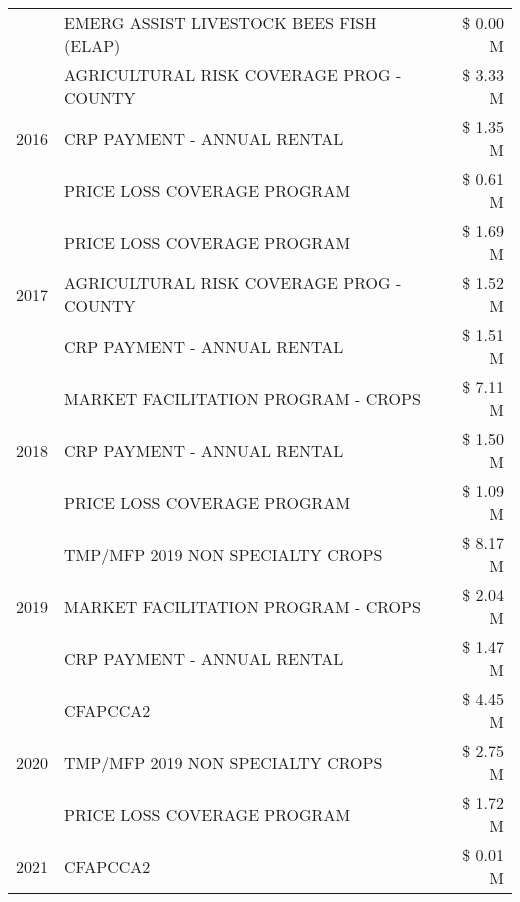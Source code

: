 \begin{tabular}{llr}
 & EMERG ASSIST LIVESTOCK BEES FISH (ELAP) & \$ 0.00 M \\
\cline{1-3}
\multirow[t]{3}{*}{2016} & AGRICULTURAL RISK COVERAGE PROG - COUNTY      & \$ 3.33 M \\
 & CRP PAYMENT - ANNUAL RENTAL                   & \$ 1.35 M \\
 & PRICE LOSS COVERAGE PROGRAM                   & \$ 0.61 M \\
\cline{1-3}
\multirow[t]{3}{*}{2017} & PRICE LOSS COVERAGE PROGRAM & \$ 1.69 M \\
 & AGRICULTURAL RISK COVERAGE PROG - COUNTY & \$ 1.52 M \\
 & CRP PAYMENT - ANNUAL RENTAL & \$ 1.51 M \\
\cline{1-3}
\multirow[t]{3}{*}{2018} & MARKET FACILITATION PROGRAM - CROPS & \$ 7.11 M \\
 & CRP PAYMENT - ANNUAL RENTAL & \$ 1.50 M \\
 & PRICE LOSS COVERAGE PROGRAM & \$ 1.09 M \\
\cline{1-3}
\multirow[t]{3}{*}{2019} & TMP/MFP 2019 NON SPECIALTY CROPS & \$ 8.17 M \\
 & MARKET FACILITATION PROGRAM - CROPS & \$ 2.04 M \\
 & CRP PAYMENT - ANNUAL RENTAL & \$ 1.47 M \\
\cline{1-3}
\multirow[t]{3}{*}{2020} & CFAPCCA2 & \$ 4.45 M \\
 & TMP/MFP 2019 NON SPECIALTY CROPS & \$ 2.75 M \\
 & PRICE LOSS COVERAGE PROGRAM & \$ 1.72 M \\
\cline{1-3}
2021 & CFAPCCA2 & \$ 0.01 M \\
\cline{1-3}
\bottomrule
\end{tabular}
